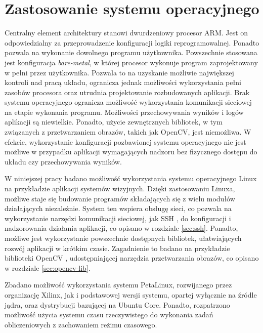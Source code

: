 \section{Zastosowanie systemu operacyjnego}
\label{sec:arm-programming}

Centralny element architektury stanowi dwurdzeniowy procesor ARM. 
Jest on odpowiedzialny za przeprowadzenie konfiguracji logiki reprogramowalnej. 
Ponadto pozwala na wykonanie dowolnego programu użytkownika. 
Powszechnie stosowana jest konfiguracja \textit{bare-metal}, w której procesor wykonuje program zaprojektowany w pełni przez użytkownika. 
Pozwala to na uzyskanie możliwie największej kontroli nad pracą układu, ogranicza jednak możliwości wykorzystania pełni zasobów procesora oraz utrudnia projektowanie rozbudowanych aplikacji. Brak systemu operacyjnego ogranicza możliwość wykorzystania komunikacji sieciowej na etapie wykonania programu. Możliwości przechowywania wyników i logów aplikacji są niewielkie. Ponadto, użycie zewnętrznych bibliotek, w tym związanych z przetwarzaniem obrazów, takich jak OpenCV, jest niemożliwa. W efekcie, wykorzystanie konfiguracji pozbawionej systemu operacyjnego nie jest możliwe w przypadku aplikacji wymagających nadzoru bez fizycznego dostępu do układu czy przechowywania wyników.

W niniejszej pracy badano możliwość wykorzystania systemu operacyjnego Linux na przykładzie aplikacji systemów wizyjnych. 
Dzięki zastosowaniu Linuxa, możliwe staje się budowanie programów składających się z wielu modułów działających niezależnie. 
System ten wspiera obsługę sieci, co pozwala na wykorzystanie narzędzi komunikacji sieciowej, jak SSH \cite{ssh-protocol}, do konfiguracji i nadzorowania działania aplikacji, co opisano w rozdziale \ref{sec:ssh}. 
Ponadto, możliwe jest wykorzystanie powszechnie dostępnych bibliotek, ułatwiających rozwój aplikacji w krótkim czasie. 
Zagadnienie to badano na przykładzie biblioteki OpenCV \cite{opencv-library}, udostępniającej narzędzia przetwarzania obrazów, co opisano w rozdziale \ref{sec:opencv-lib}.

Zbadano możliwość wykorzystania systemu PetaLinux, rozwijanego przez organizację Xilinx, jak i podstawowej wersji systemu, opartej wyłącznie na źródle jądra, oraz dystrybucji bazującej na Ubuntu Core. %
Ponadto, rozpatrzono możliwość użycia systemu czasu rzeczywistego do wykonania zadań obliczeniowych z zachowaniem reżimu czasowego.

